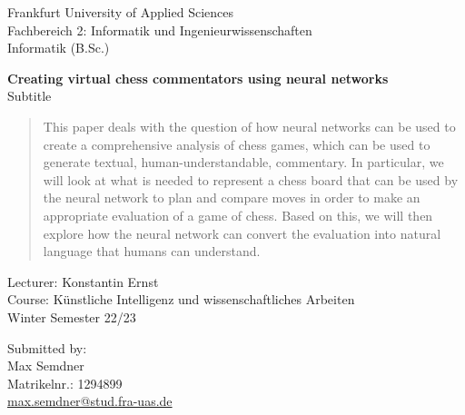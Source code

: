 \begin{titlepage}
\begin{flushleft}
Frankfurt University of Applied Sciences\\
Fachbereich 2: Informatik und Ingenieurwissenschaften\\
Informatik (B.Sc.)\\
\end{flushleft}

\vspace{3.5cm}

\begin{center}
\Large
\textbf{Creating virtual chess commentators using neural networks}\\
Subtitle
\end{center}

\begin{abstract}
This paper deals with the question of how neural networks can be used to create a comprehensive analysis of chess games, which can be used to generate textual, human-understandable, commentary. In particular, we will look at what is needed to represent a chess board that can be used by the neural network to plan and compare moves in order to make an appropriate evaluation of a game of chess. Based on this, we will then explore how the neural network can convert the evaluation into natural language that humans can understand.
\end{abstract}

\vspace{6cm}
	
\begin{flushright}
Lecturer: Konstantin Ernst\\
Course: Künstliche Intelligenz und wissenschaftliches Arbeiten\\
Winter Semester 22/23\\
\end{flushright}

\vspace{2cm}

\begin{flushleft}
Submitted by:\\
Max Semdner\\
Matrikelnr.: 1294899\\
\href{mailto: max.semdner@stud.fra-uas.de}{max.semdner@stud.fra-uas.de}\\
\end{flushleft}

\end{titlepage}